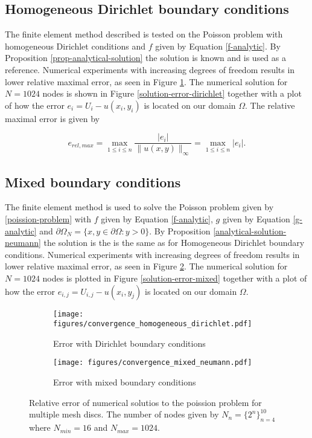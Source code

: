 \documentclass[11pt,a4paper,english]{elsarticle}%
\begin{document}
\subsection{Homogeneous Dirichlet boundary conditions}
The finite element method described is tested on the Poisson problem with homogeneous Dirichlet conditions and $f$ given by Equation \eqref{f-analytic}. 
By Proposition \ref{prop-analytical-solution} the solution is known and is used as a reference. 
Numerical experiments with increasing degrees of freedom results in lower relative maximal error, as seen in Figure \ref{convergence-dirichlet}. The numerical solution for $N = 1024$ nodes is shown in Figure \ref{solution-error-dirichlet}
together with a plot of how the error $e_{i} = U_{i} - u(x_i,y_i)$ is located on our domain $\Omega$. 
The relative maximal error is given by

\begin{equation*}
    e_{rel,max} = \max_{1\leq i \leq n} \frac{|e_i|}{\| u(x,y)\|_{\infty}} = \max_{1\leq i \leq n} |e_i|.
\end{equation*}

\subsection{Mixed boundary conditions}
The finite element method is used to solve the Poisson problem given by \eqref{poission-problem} with $f$ given by Equation \eqref{f-analytic}, $g$ given by Equation \eqref{g-analytic} and $\partial \Omega_N = \{ x,y \in \partial \Omega : y> 0\}$. By Proposition \ref{analytical-solution-neumann} the solution is the is the same as for Homogeneous Dirichlet boundary conditions. Numerical experiments with increasing degrees of freedom results in lower relative maximal error, as seen in Figure \ref{convergence-neumann}. The numerical solution for $N = 1024$ nodes is plotted in Figure \ref{solution-error-mixed} together with a plot of how the error $e_{i,j} = U_{i,j} - u(x_i,y_j)$ is located on our domain $\Omega$. 

\begin{figure}[t]
\begin{subfigure}[t]{0.5\linewidth}
        \centering
            \texttt{[image: figures/convergence\_homogeneous\_dirichlet.pdf]}
        \caption{Error with Dirichlet boundary conditions}
        \label{convergence-dirichlet}
    \end{subfigure}\qquad
    \begin{subfigure}[t]{0.5\linewidth}
        \centering
            \texttt{[image: figures/convergence\_mixed\_neumann.pdf]}
        \caption{Error with mixed boundary conditions}
        \label{convergence-neumann}
    \end{subfigure}
    \label{fig-convergence}
    \caption{Relative error of numerical solutios to the poission problem for multiple mesh discs. The number of nodes given by $N_n = \{ 2^n\}_{n=4}^{10}$
    where $N_{min} = 16$ and $N_{max} = 1024$.}
\end{figure}
   
\end{document}
